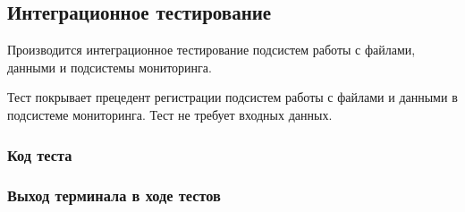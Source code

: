 \documentclass[a4paper,12pt]{report}
\numberwithin{equation}{section}
\begin{document}
\subsection{Интеграционное тестирование}
Производится интеграционное тестирование подсистем работы с файлами, данными и подсистемы мониторинга.


Тест покрывает прецедент регистрации подсистем работы с файлами и данными в подсистеме мониторинга.
Тест не требует входных данных.


\subsubsection{Код теста}


\subsubsection{Выход терминала в ходе тестов}

\end{document}
